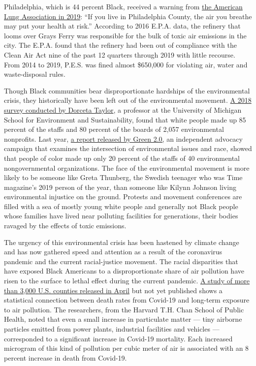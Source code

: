 Philadelphia, which is 44 percent Black, received a warning from
\href{http://www.stateoftheair.org/city-rankings/states/pennsylvania/philadelphia.html}{the
American Lung Association in 2019}: ``If you live in Philadelphia
County, the air you breathe may put your health at risk.'' According to
2016 E.P.A. data, the refinery that looms over Grays Ferry was
responsible for the bulk of toxic air emissions in the city. The E.P.A.
found that the refinery had been out of compliance with the Clean Air
Act nine of the past 12 quarters through 2019 with little recourse. From
2014 to 2019, P.E.S. was fined almost \$650,000 for violating air, water
and waste-disposal rules.

Though Black communities bear disproportionate hardships of the
environmental crisis, they historically have been left out of the
environmental movement.
\href{http://orgs.law.harvard.edu/els/files/2014/02/FullReport_Green2.0_FINALReducedSize.pdf}{A
2018 survey conducted by Dorceta Taylor}, a professor at the University
of Michigan School for Environment and Sustainability, found that white
people made up 85 percent of the staffs and 80 percent of the boards of
2,057 environmental nonprofits. Last year,
\href{https://www.diversegreen.org/wp-content/uploads/2019/06/Green_2.0_Retention_Report.pdf}{a
report released by Green 2.0,} an independent advocacy campaign that
examines the intersection of environmental issues and race, showed that
people of color made up only 20 percent of the staffs of 40
environmental nongovernmental organizations. The face of the
environmental movement is more likely to be someone like Greta Thunberg,
the Swedish teenager who was Time magazine's 2019 person of the year,
than someone like Kilynn Johnson living environmental injustice on the
ground. Protests and movement conferences are filled with a sea of
mostly young white people and generally not Black people whose families
have lived near polluting facilities for generations, their bodies
ravaged by the effects of toxic emissions.

The urgency of this environmental crisis has been hastened by climate
change and has now gathered speed and attention as a result of the
coronavirus pandemic and the current racial-justice movement. The racial
disparities that have exposed Black Americans to a disproportionate
share of air pollution have risen to the surface to lethal effect during
the current pandemic. \href{https://projects.iq.harvard.edu/covid-pm}{A
study of more than 3,000 U.S. counties released in April} but not yet
published shows a statistical connection between death rates from
Covid-19 and long-term exposure to air pollution. The researchers, from
the Harvard T.H. Chan School of Public Health, noted that even a small
increase in particulate matter --- tiny airborne particles emitted from
power plants, industrial facilities and vehicles --- corresponded to a
significant increase in Covid-19 mortality. Each increased microgram of
this kind of pollution per cubic meter of air is associated with an 8
percent increase in death from Covid-19.

